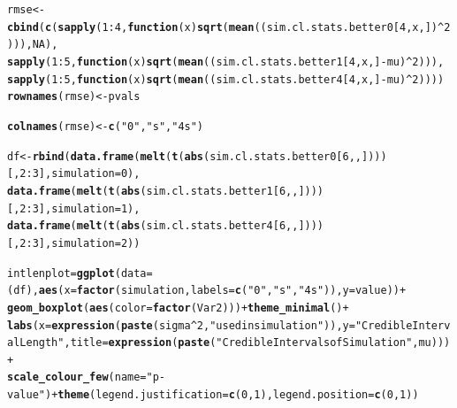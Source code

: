 \documentclass[AMA,STIX1COL]{WileyNJD-v2}\usepackage[]{graphicx}\usepackage[]{color}
\makeatletter
\newcommand{\hlnum}[1]{\textcolor[rgb]{0.686,0.059,0.569}{#1}}%
\newcommand{\hlstr}[1]{\textcolor[rgb]{0.192,0.494,0.8}{#1}}%
\newcommand{\hlopt}[1]{\textcolor[rgb]{0,0,0}{#1}}%
\newcommand{\hlstd}[1]{\textcolor[rgb]{0.345,0.345,0.345}{#1}}%
\newcommand{\hlkwa}[1]{\textcolor[rgb]{0.161,0.373,0.58}{\textbf{#1}}}%
\newcommand{\hlkwb}[1]{\textcolor[rgb]{0.69,0.353,0.396}{#1}}%
\newcommand{\hlkwc}[1]{\textcolor[rgb]{0.333,0.667,0.333}{#1}}%
\newcommand{\hlkwd}[1]{\textcolor[rgb]{0.737,0.353,0.396}{\textbf{#1}}}%
\newenvironment{kframe}{%
 \def\at@end@of@kframe{}%
 \ifinner\ifhmode%
  \def\at@end@of@kframe{\end{minipage}}%
  \begin{minipage}{\columnwidth}%
 \fi\fi%
 \def\FrameCommand##1{\hskip\@totalleftmargin \hskip-\fboxsep
 \colorbox{shadecolor}{##1}\hskip-\fboxsep
     \hskip-\linewidth \hskip-\@totalleftmargin \hskip\columnwidth}%
 \MakeFramed {\advance\hsize-\width
   \@totalleftmargin\z@ \linewidth\hsize
   \@setminipage}}%
 {\par\unskip\endMakeFramed%
 \at@end@of@kframe}
\newenvironment{knitrout}{}{} %
\makeatother
\begin{document}
\begin{knitrout}
\begin{kframe}
\begin{alltt}
\hlstd{rmse}\hlkwb{<-} \hlkwd{cbind}\hlstd{(}\hlkwd{c}\hlstd{(}\hlkwd{sapply}\hlstd{(}\hlnum{1}\hlopt{:}\hlnum{4}\hlstd{,} \hlkwa{function}\hlstd{(}\hlkwc{x}\hlstd{)} \hlkwd{sqrt}\hlstd{(}\hlkwd{mean}\hlstd{((sim.cl.stats.better0[}\hlnum{4}\hlstd{,x,])}\hlopt{^}\hlnum{2}\hlstd{))),} \hlnum{NA}\hlstd{),}
             \hlkwd{sapply}\hlstd{(}\hlnum{1}\hlopt{:}\hlnum{5}\hlstd{,} \hlkwa{function}\hlstd{(}\hlkwc{x}\hlstd{)} \hlkwd{sqrt}\hlstd{(}\hlkwd{mean}\hlstd{((sim.cl.stats.better1[}\hlnum{4}\hlstd{,x,]}\hlopt{-}\hlstd{mu)}\hlopt{^}\hlnum{2}\hlstd{))),}
               \hlkwd{sapply}\hlstd{(}\hlnum{1}\hlopt{:}\hlnum{5}\hlstd{,} \hlkwa{function}\hlstd{(}\hlkwc{x}\hlstd{)} \hlkwd{sqrt}\hlstd{(}\hlkwd{mean}\hlstd{((sim.cl.stats.better4[}\hlnum{4}\hlstd{,x,]}\hlopt{-}\hlstd{mu)}\hlopt{^}\hlnum{2}\hlstd{))))}
\hlkwd{rownames}\hlstd{(rmse)}\hlkwb{<-}\hlstd{pvals}

\hlkwd{colnames}\hlstd{(rmse)}\hlkwb{<-}\hlkwd{c}\hlstd{(}\hlstr{"0"}\hlstd{,}\hlstr{"s"}\hlstd{,} \hlstr{"4s"}\hlstd{)}



\hlstd{df}\hlkwb{<-} \hlkwd{rbind}\hlstd{(}\hlkwd{data.frame}\hlstd{(}\hlkwd{melt}\hlstd{(}\hlkwd{t}\hlstd{(}\hlkwd{abs}\hlstd{(sim.cl.stats.better0[}\hlnum{6}\hlstd{,,])))[,}\hlnum{2}\hlopt{:}\hlnum{3}\hlstd{],} \hlkwc{simulation}\hlstd{=}\hlnum{0}\hlstd{),}
           \hlkwd{data.frame}\hlstd{(}\hlkwd{melt}\hlstd{(}\hlkwd{t}\hlstd{(}\hlkwd{abs}\hlstd{(sim.cl.stats.better1[}\hlnum{6}\hlstd{,,])))[,}\hlnum{2}\hlopt{:}\hlnum{3}\hlstd{],} \hlkwc{simulation}\hlstd{=}\hlnum{1}\hlstd{),}
           \hlkwd{data.frame}\hlstd{(}\hlkwd{melt}\hlstd{(}\hlkwd{t}\hlstd{(}\hlkwd{abs}\hlstd{(sim.cl.stats.better4[}\hlnum{6}\hlstd{,,])))[,}\hlnum{2}\hlopt{:}\hlnum{3}\hlstd{],} \hlkwc{simulation}\hlstd{=}\hlnum{2}\hlstd{))}

\hlstd{intlenplot} \hlkwb{=} \hlkwd{ggplot}\hlstd{(}\hlkwc{data} \hlstd{= (df),} \hlkwd{aes}\hlstd{(}\hlkwc{x}\hlstd{=}\hlkwd{factor}\hlstd{(simulation,} \hlkwc{labels}\hlstd{=}\hlkwd{c}\hlstd{(}\hlstr{"0"}\hlstd{,}\hlstr{"s"}\hlstd{,}\hlstr{"4s"}\hlstd{)),} \hlkwc{y}\hlstd{=value))} \hlopt{+}
  \hlkwd{geom_boxplot}\hlstd{(}\hlkwd{aes}\hlstd{(}\hlkwc{color}\hlstd{=}\hlkwd{factor}\hlstd{(Var2)))}\hlopt{+}  \hlkwd{theme_minimal}\hlstd{()} \hlopt{+}
  \hlkwd{labs}\hlstd{(}\hlkwc{x}\hlstd{=}\hlkwd{expression}\hlstd{(}\hlkwd{paste}\hlstd{(sigma}\hlopt{^}\hlnum{2}\hlstd{,} \hlstr{" used in simulation"}\hlstd{)),}\hlkwc{y}\hlstd{=}\hlstr{"Credible Interval Length"}\hlstd{,} \hlkwc{title}\hlstd{=}\hlkwd{expression}\hlstd{(}\hlkwd{paste}\hlstd{(}\hlstr{"Credible Intervals of Simulation "}\hlstd{,mu )))}\hlopt{+}
  \hlkwd{scale_colour_few}\hlstd{(}\hlkwc{name}\hlstd{=}\hlstr{"p-value"}\hlstd{)} \hlopt{+}  \hlkwd{theme}\hlstd{(} \hlkwc{legend.justification}\hlstd{=}\hlkwd{c}\hlstd{(}\hlnum{0}\hlstd{,}\hlnum{1}\hlstd{),} \hlkwc{legend.position}\hlstd{=}\hlkwd{c}\hlstd{(}\hlnum{0}\hlstd{,}\hlnum{1}\hlstd{))}


\end{alltt}
\end{kframe}
\end{knitrout}
\end{document}
